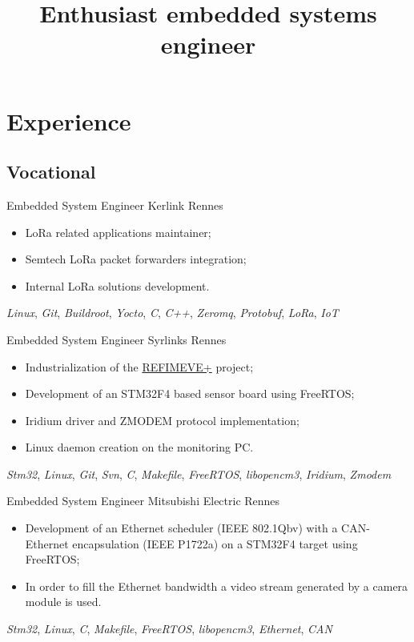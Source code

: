 \documentclass[11pt,a4paper,sans]{moderncv}
\title{Enthusiast embedded systems engineer}
\begin{document}
\makecvtitle

\section{Experience}
\subsection{Vocational}
	{Embedded System Engineer}
	{Kerlink}
	{Rennes}
	{}
	{
		\begin{itemize}
		\item LoRa related applications maintainer;
		\item Semtech LoRa packet forwarders integration;
		\item Internal LoRa solutions development.
		\end{itemize}
		\textit{Linux},
		\textit{Git},
		\textit{Buildroot}, \textit{Yocto},
		\textit{C}, \textit{C++},
		\textit{Zeromq}, \textit{Protobuf},
		\textit{LoRa}, \textit{IoT}
	}
	{Embedded System Engineer}
	{Syrlinks}
	{Rennes}
	{}
	{
		\begin{itemize}
		\item Industrialization of the
			\href{http://www.refimeve.fr}{REFIMEVE+} project;
		\item Development of an STM32F4 based sensor board using FreeRTOS;
		\item Iridium driver and ZMODEM protocol implementation;
		\item Linux daemon creation on the monitoring PC.
		\end{itemize}
		\textit{Stm32},
		\textit{Linux},
		\textit{Git}, \textit{Svn},
		\textit{C}, \textit{Makefile},
		\textit{FreeRTOS}, \textit{libopencm3},
		\textit{Iridium}, \textit{Zmodem}
	}
	{Embedded System Engineer}
	{Mitsubishi Electric}
	{Rennes}
	{}
	{
		\begin{itemize}
		\item Development of an Ethernet scheduler (IEEE 802.1Qbv)
			with a CAN-Ethernet encapsulation (IEEE P1722a)
			on a STM32F4 target using FreeRTOS;
		\item In order to fill the Ethernet bandwidth a video stream
			generated by a camera module is used.
		\end{itemize}
		\textit{Stm32},
		\textit{Linux},
		\textit{C}, \textit{Makefile},
		\textit{FreeRTOS}, \textit{libopencm3},
		\textit{Ethernet}, \textit{CAN}
	}
\end{document}
